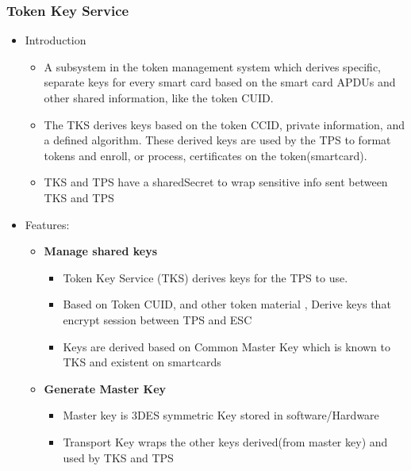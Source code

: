 \documentclass[a4paper]{article}
\begin{document}
\subsubsection{Token Key Service}
    \begin{itemize}
        \item Introduction
            \begin{itemize}
                \item A subsystem in the token management system which derives specific, separate keys for every
                    smart card based on the smart card APDUs and other shared information, like the token CUID.~\cite{RedHat:AdminGuide}
                \item The TKS derives keys based on the token CCID, private information, and a defined algorithm. 
                    These derived keys are used by the TPS to format tokens and enroll, or process, certificates on the token(smartcard).~\cite{RedHat:AdminGuide}
                \item TKS and TPS have a sharedSecret to wrap sensitive info sent between TKS and TPS
            \end{itemize}
        \item Features:
            \begin{itemize}
                \item \textbf{Manage shared keys}
                    \begin{itemize}
                        \item Token Key Service (TKS) derives keys for the TPS to use.
                        \item Based on Token CUID, and other token material , Derive keys that encrypt session between TPS and ESC
                        \item Keys are derived based on Common Master Key which is known to TKS and existent on smartcards
                    \end{itemize}
                \item \textbf{Generate Master Key}
                    \begin{itemize}
                        \item Master key is 3DES symmetric Key stored in software/Hardware
                        \item Transport Key wraps the other keys derived(from master key) and used by TKS and TPS
                    \end{itemize}
            \end{itemize}
    \end{itemize}
\end{document}
